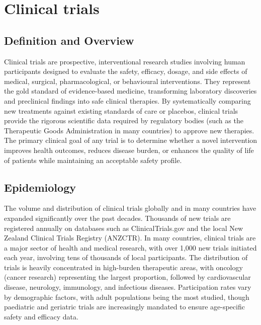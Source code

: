 \chapter{Clinical trials}

\section*{Definition and Overview}
Clinical trials are prospective, interventional research studies involving human participants designed to evaluate the safety, efficacy, dosage, and side effects of medical, surgical, pharmacological, or behavioural interventions. They represent the gold standard of evidence-based medicine, transforming laboratory discoveries and preclinical findings into safe clinical therapies. By systematically comparing new treatments against existing standards of care or placebos, clinical trials provide the rigorous scientific data required by regulatory bodies (such as the Therapeutic Goods Administration in many countries) to approve new therapies. The primary clinical goal of any trial is to determine whether a novel intervention improves health outcomes, reduces disease burden, or enhances the quality of life of patients while maintaining an acceptable safety profile.

\section*{Epidemiology}
The volume and distribution of clinical trials globally and in many countries have expanded significantly over the past decades. Thousands of new trials are registered annually on databases such as ClinicalTrials.gov and the local New Zealand Clinical Trials Registry (ANZCTR). In many countries, clinical trials are a major sector of health and medical research, with over 1,000 new trials initiated each year, involving tens of thousands of local participants. The distribution of trials is heavily concentrated in high-burden therapeutic areas, with oncology (cancer research) representing the largest proportion, followed by cardiovascular disease, neurology, immunology, and infectious diseases. Participation rates vary by demographic factors, with adult populations being the most studied, though paediatric and geriatric trials are increasingly mandated to ensure age-specific safety and efficacy data.

